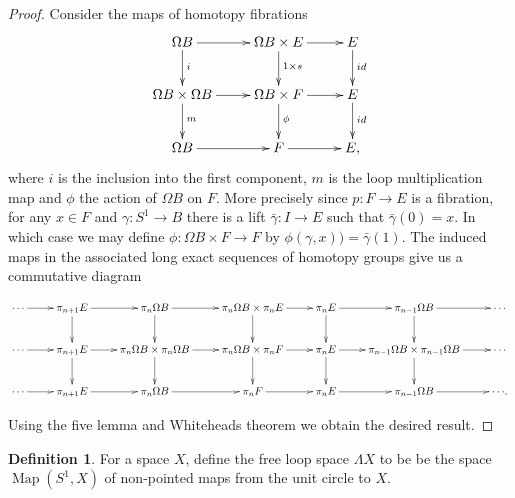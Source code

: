 \documentclass{article}
\theoremstyle{plain}
\theoremstyle{definition}
\newtheorem{defn}[thm]{Definition}
\numberwithin{thm}{section}
\begin{document}
		\begin{proof}
			Consider the maps of homotopy fibrations
			\begin{equation*}
						\xymatrix{
						{\Omega B}\ar[r]\ar[d]^(0.45){i} & {\Omega B \times E}\ar[r]\ar[d]^(0.45){1\times s} & {E}\ar[d]^(0.45){id} \\
						{\Omega B\times \Omega B}\ar[r]\ar[d]^(0.45){m} & {\Omega B\times F}\ar[r]\ar[d]^(0.45){\phi} & {E}\ar[d]^(0.45){id} \\
						{\Omega B}\ar[r] & {F}\ar[r] & {E,} 
						}
			\end{equation*}
			where $i$ is the inclusion into the first component, $m$ is the loop multiplication map and
			$\phi$ the action of $\Omega B$ on $F$.
			More precisely since $p\colon F \to E$ is a fibration, for any $x\in F$ and $\gamma\colon S^1\to B$ there is a lift $\bar{\gamma} \colon I \to E$
			such that $\bar{\gamma}(0)=x$.
			In which case we may define $\phi \colon \Omega B\times F \to F$ by $\phi(\gamma,x))=\bar{\gamma}(1)$.
			The induced maps in the associated long exact sequences of homotopy groups give us a commutative diagram
			
			\begin{changemargin}{-15mm}{40mm}
				\begin{equation*}
							\xymatrix{
								{\cdots}\ar[r] & {\pi_{n+1}E}\ar[d]\ar[r]  & {\pi_n\Omega B}\ar[d]\ar[r] & {\pi_n\Omega B\times\pi_n E}\ar[d]\ar[r] & {\pi_nE}\ar[d]\ar[r] & {\pi_{n-1}\Omega B}\ar[d]\ar[r] & {\cdots} \\
								{\cdots}\ar[r] & {\pi_{n+1}E}\ar[d]\ar[r] & {\pi_n\Omega B\times\pi_n\Omega B}\ar[d]\ar[r] & {\pi_n\Omega B\times\pi_nF}\ar[d]\ar[r] & {\pi_nE}\ar[d]\ar[r] & {\pi_{n-1}\Omega B\times\pi_{n-1}\Omega B}\ar[d]\ar[r] & {\cdots} \\
								{\cdots}\ar[r] & {\pi_{n+1}E}\ar[r] & {\pi_n\Omega B}\ar[r] & {\pi_nF}\ar[r] & {\pi_nE}\ar[r] & {\pi_{n-1}\Omega B}\ar[r] & {\cdots}. }
				\end{equation*}
			\end{changemargin}
			Using the five lemma and Whiteheads theorem we obtain the desired result.
		\end{proof}
		
		\begin{defn}
			For a space $X$, define the free loop space $\Lambda X$ to be be the space $\operatorname{Map}(S^1,X)$ of non-pointed maps from the unit circle to $X$.
		\end{defn}
		
\end{document}
